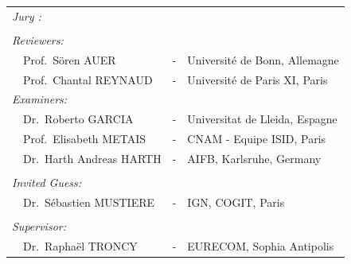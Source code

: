 {\begin{titlepage}
\begin{center}
\noindent \large
\begin{tabular}{llcl}
  \textit{Jury :}	& 		& & \\\\
  \textit{Reviewers:} & & & \\
  \multicolumn{2}{l}{~~Prof.\ S\"{o}ren \textsc{AUER}} 		& - &  Universit\'{e} de Bonn, Allemagne\\
  \multicolumn{2}{l}{~~Prof.\ Chantal \textsc{REYNAUD}} 		& - &  Universit\'{e} de Paris XI, Paris \\
  \textit{Examiners:}& 		& & \\
  \multicolumn{2}{l}{~~Dr.\ Roberto \textsc{ GARCIA}}           & - &  Universitat de Lleida, Espagne \\
  \multicolumn{2}{l}{~~Prof.\ Elisabeth \textsc{METAIS}}           & - & CNAM - Equipe ISID, Paris  \\
  \multicolumn{2}{l}{~~Dr.\ Harth Andreas \textsc{HARTH}}           & - & AIFB, Karlsruhe, Germany \\
\\
  \textit{Invited Guess:}& 		& & \\
  \multicolumn{2}{l}{~~Dr.\ S\'{e}bastien \textsc{MUSTIERE}}           & - &  IGN, COGIT, Paris \\
\\
  \textit{Supervisor:}& 		& & \\
  \multicolumn{2}{l}{~~Dr.\  Rapha\"{e}l \textsc{TRONCY}} 		& - & EURECOM, Sophia Antipolis \\
\end{tabular}
\end{center}

\end{titlepage}

}
